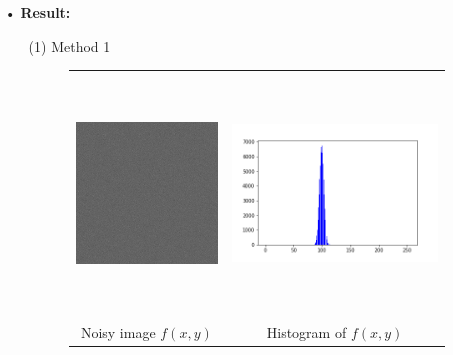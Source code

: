 \documentclass[12pt,a4paper]{article}
\begin{document}
\begin{enumerate}
\newpage
\item[•]
{\bf Result:}
\begin{enumerate}
\item[(1)]Method 1
\begin{figure}[h]
\hspace*{1em}
\begin{tabular}{cc}
\includegraphics[height=2.5in]{image_f1.jpg}&
\includegraphics[height=2.5in]{f1_histogram.png}\\
Noisy image $f(x, y)$ & Histogram of $f(x, y)$
\end{tabular}
\end{figure}
 

\end{enumerate}
\end{enumerate}
\end{document}
